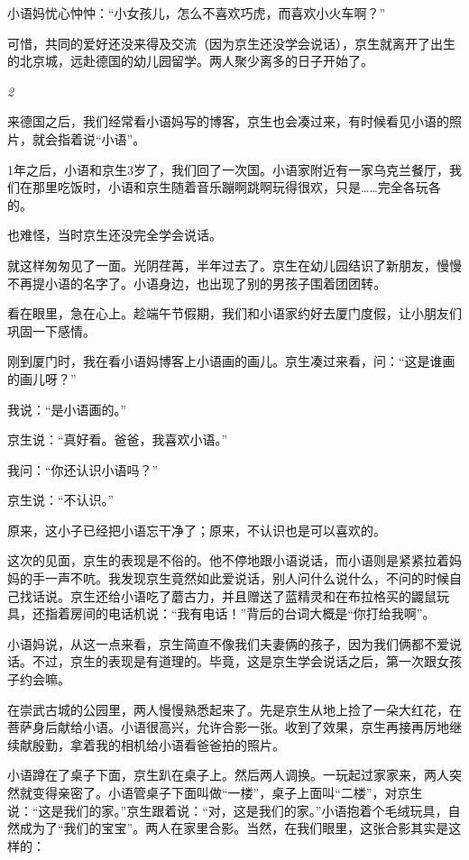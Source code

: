 \documentclass[twoside,openright,headings=optiontohead]{ctexbook} %
\begin{document}
{小语妈忧心忡忡：``小女孩儿，怎么不喜欢巧虎，而喜欢小火车啊？''

可惜，共同的爱好还没来得及交流（因为京生还没学会说话），京生就离开了出生的北京城，远赴德国的幼儿园留学。两人聚少离多的日子开始了。

\emph{2}

来德国之后，我们经常看小语妈写的博客，京生也会凑过来，有时候看见小语的照片，就会指着说``小语''。

1年之后，小语和京生3岁了，我们回了一次国。小语家附近有一家乌克兰餐厅，我们在那里吃饭时，小语和京生随着音乐蹦啊跳啊玩得很欢，只是\ldots{}\ldots{}完全各玩各的。

也难怪，当时京生还没完全学会说话。

就这样匆匆见了一面。光阴荏苒，半年过去了。京生在幼儿园结识了新朋友，慢慢不再提小语的名字了。小语身边，也出现了别的男孩子围着团团转。

看在眼里，急在心上。趁端午节假期，我们和小语家约好去厦门度假，让小朋友们巩固一下感情。

刚到厦门时，我在看小语妈博客上小语画的画儿。京生凑过来看，问：``这是谁画的画儿呀？''

我说：``是小语画的。''

京生说：``真好看。爸爸，我喜欢小语。''

我问：``你还认识小语吗？''

京生说：``不认识。''

原来，这小子已经把小语忘干净了；原来，不认识也是可以喜欢的。

这次的见面，京生的表现是不俗的。他不停地跟小语说话，而小语则是紧紧拉着妈妈的手一声不吭。我发现京生竟然如此爱说话，别人问什么说什么，不问的时候自己找话说。京生还给小语吃了蘑古力，并且赠送了蓝精灵和在布拉格买的鼹鼠玩具，还指着房间的电话机说：``我有电话！''背后的台词大概是``你打给我啊''。

小语妈说，从这一点来看，京生简直不像我们夫妻俩的孩子，因为我们俩都不爱说话。不过，京生的表现是有道理的。毕竟，这是京生学会说话之后，第一次跟女孩子约会嘛。

在崇武古城的公园里，两人慢慢熟悉起来了。先是京生从地上捡了一朵大红花，在菩萨身后献给小语。小语很高兴，允许合影一张。收到了效果，京生再接再厉地继续献殷勤，拿着我的相机给小语看爸爸拍的照片。

小语蹲在了桌子下面，京生趴在桌子上。然后两人调换。一玩起过家家来，两人突然就变得亲密了。小语管桌子下面叫做``一楼''，桌子上面叫``二楼''，对京生说：``这是我们的家。''京生跟着说：``对，这是我们的家。''小语抱着个毛绒玩具，自然成为了``我们的宝宝''。两人在家里合影。当然，在我们眼里，这张合影其实是这样的：

}
\end{document}
